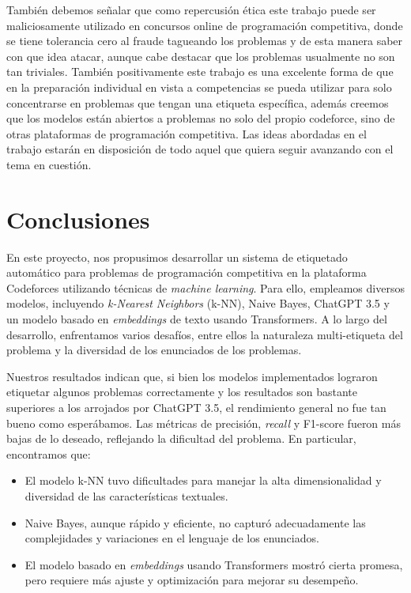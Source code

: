 \documentclass{article}
\begin{document}
También debemos señalar que como repercusión ética este trabajo puede ser maliciosamente utilizado en concursos online de 
programación competitiva, donde se tiene tolerancia cero al fraude tagueando los problemas 
y de esta manera saber con que idea atacar, aunque cabe destacar que los problemas usualmente no son tan triviales. También positivamente este trabajo es una excelente forma de que en la preparación individual en vista a competencias se pueda utilizar para solo concentrarse en problemas que tengan una etiqueta específica, además creemos que los modelos están abiertos a problemas no solo del propio codeforce, sino de otras plataformas de programación competitiva. Las ideas abordadas en el trabajo
estarán en disposición de todo aquel que quiera seguir avanzando con el tema en cuestión.

\section{Conclusiones}

En este proyecto, nos propusimos desarrollar un sistema de etiquetado automático para problemas de programación competitiva en la plataforma Codeforces utilizando técnicas de \textit{machine learning}. Para ello, empleamos diversos modelos, incluyendo \textit{k-Nearest Neighbors} (k-NN), Naive Bayes, ChatGPT 3.5 y un modelo basado en \textit{embeddings} de texto usando Transformers. A lo largo del desarrollo, enfrentamos varios desafíos, entre ellos la naturaleza multi-etiqueta del problema y la diversidad de los enunciados de los problemas.

Nuestros resultados indican que, si bien los modelos implementados lograron etiquetar algunos problemas correctamente y los resultados son bastante superiores a los arrojados por ChatGPT 3.5, el rendimiento general no fue tan bueno como esperábamos. Las métricas de precisión, \textit{recall} y F1-score fueron más bajas de lo deseado, reflejando la dificultad del problema. En particular, encontramos que:

\begin{itemize}
    \item El modelo k-NN tuvo dificultades para manejar la alta dimensionalidad y diversidad de las características textuales.
    \item Naive Bayes, aunque rápido y eficiente, no capturó adecuadamente las complejidades y variaciones en el lenguaje de los enunciados.
    \item El modelo basado en \textit{embeddings} usando Transformers mostró cierta promesa, pero requiere más ajuste y optimización para mejorar su desempeño.
\end{itemize}
\end{document}
